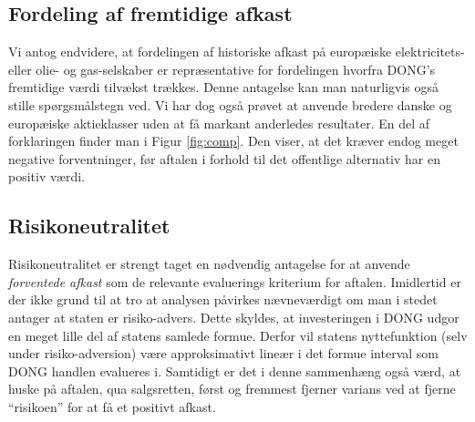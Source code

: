 \documentclass{article}
\begin{document}
\begin{appendices}


\subsection{Fordeling af fremtidige afkast}

Vi antog endvidere, at fordelingen af historiske afkast på europæiske elektricitets- eller olie- og gas-selskaber er repræsentative for fordelingen hvorfra DONG's fremtidige værdi tilvækst trækkes. Denne antagelse kan man naturligvis også stille spørgsmålstegn ved. Vi har dog også prøvet at anvende bredere danske og europæiske aktieklasser uden at få markant anderledes resultater. En del af forklaringen finder man i Figur \ref{fig:comp}. Den viser, at det kræver endog meget negative forventninger, før aftalen i forhold til det offentlige alternativ har en positiv værdi.


\subsection{Risikoneutralitet}

Risikoneutralitet er strengt taget en nødvendig antagelse for at anvende \emph{forventede afkast} som de relevante evaluerings kriterium for aftalen. Imidlertid er der ikke grund til at tro at analysen påvirkes nævneværdigt om man i stedet antager at staten er risiko-advers. Dette skyldes, at investeringen i DONG udgor en meget lille del af statens samlede formue. Derfor vil statens nyttefunktion (selv under risiko-adversion) være approksimativt lineær i det formue interval som DONG handlen evalueres i. Samtidigt er det i denne sammenhæng også værd, at huske på aftalen, qua salgsretten, først og fremmest fjerner varians ved at fjerne \enquote{risikoen} for at få et positivt afkast. 



\end{appendices}
\end{document}
